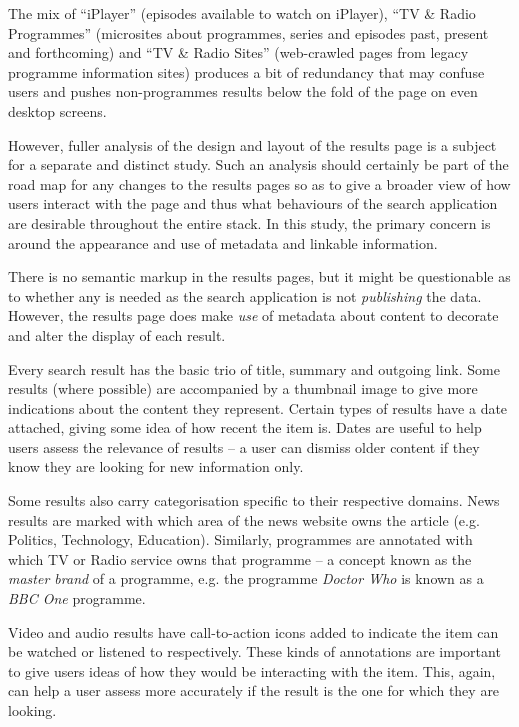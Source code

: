 The mix of ``iPlayer'' (episodes available to watch on iPlayer),
``TV \& Radio Programmes'' (microsites about programmes, series
and episodes past, present and forthcoming) and ``TV \& Radio Sites''
(web-crawled pages from legacy programme information sites) produces
a bit of redundancy that may confuse users and pushes non-programmes
results below the fold of the page on even desktop screens.

However, fuller analysis of the design and layout of the results page
is a subject for a separate and distinct study. Such an analysis
should certainly be part of the road map for any changes to the
results pages so as to give a broader view of how users interact
with the page and thus what behaviours of the search application
are desirable throughout the entire stack. In this study, the
primary concern is around the appearance and use of metadata
and linkable information.

There is no semantic markup in the results pages, but it might be
questionable as to whether any is needed as the search application
is not \emph{publishing} the data. However, the results page does
make \emph{use} of metadata about content to decorate and alter
the display of each result.

Every search result has the basic trio of title, summary and outgoing
link. Some results (where possible) are accompanied by a thumbnail
image to give more indications about the content they represent. Certain
types of results have a date attached, giving some idea of how recent
the item is. Dates are useful to help users assess the relevance
of results -- a user can dismiss older content if they know they
are looking for new information only.

Some results also carry categorisation specific to their respective
domains. News results are marked with which area of the news
website owns the article (e.g. Politics, Technology, Education). Similarly,
programmes are annotated with which TV or Radio service owns
that programme -- a concept known as the \emph{master brand} of a programme,
e.g. the programme \emph{Doctor Who} is known as a \emph{BBC One} programme.

Video and audio results have call-to-action icons added to indicate
the item can be watched or listened to respectively. These kinds
of annotations are important to give users ideas of how they would
be interacting with the item. This, again, can help a user assess more
accurately if the result is the one for which they are looking.


